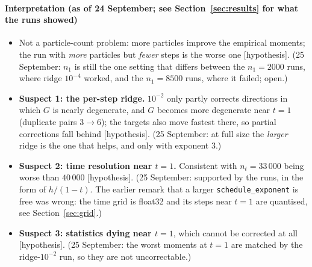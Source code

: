 \documentclass[11pt,a4paper]{article}
\newcommand{\code}[1]{\texttt{#1}}
\newcommand{\hyp}{\textcolor{orange!80!black}{\textsf{[hypothesis]}}}
\begin{document}
\paragraph{Interpretation (as of 24 September; see Section~\ref{sec:results} for what the runs showed)}
\begin{itemize}
  \item Not a particle-count problem: more particles improve the empirical moments; the run
        with \emph{more} particles but \emph{fewer} steps is the worse one \hyp.
        (25 September: $n_1$ is still the one setting that differs between the $n_1=2000$ runs,
        where ridge $10^{-4}$ worked, and the $n_1=8500$ runs, where it failed; open.)
  \item \textbf{Suspect 1: the per-step ridge.} $10^{-2}$ only partly corrects directions in
        which $G$ is nearly degenerate, and $G$ becomes more degenerate near $t=1$ (duplicate
        pairs 3$\to$6); the targets also move fastest there, so partial corrections fall behind \hyp.
        (25 September: at full size the \emph{larger} ridge is the one that helps, and only
        with exponent 3.)
  \item \textbf{Suspect 2: time resolution near $t=1$.} Consistent with $n_t=33\,000$ being
        worse than $40\,000$ \hyp. (25 September: supported by the runs, in the form of
        $h/(1-t)$. The earlier remark that a larger \code{schedule\_exponent} is free was wrong:
        the time grid is float32 and its steps near $t=1$ are quantised, see Section~\ref{sec:grid}.)
  \item \textbf{Suspect 3: statistics dying near $t=1$}, which cannot be corrected at all \hyp.
        (25 September: the worst moments at $t=1$ are matched by the ridge-$10^{-2}$ run, so they
        are not uncorrectable.)
\end{itemize}
\end{document}
